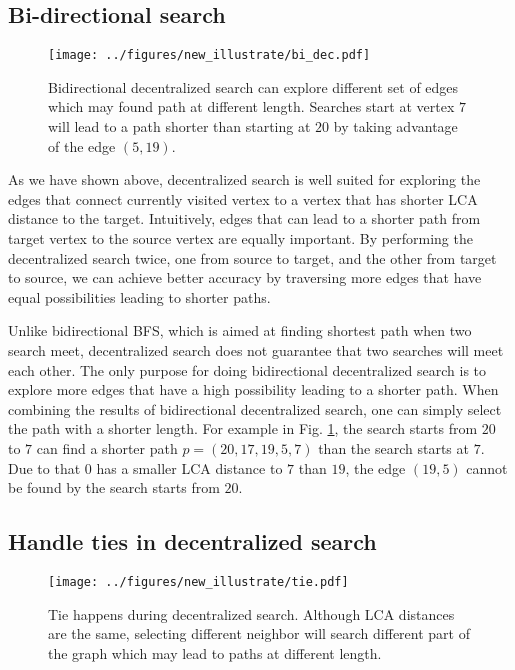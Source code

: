 \subsection{Bi-directional search}

\begin{figure}[t]
    \centering
    \texttt{[image: ../figures/new\_illustrate/bi\_dec.pdf]}
    \caption{Bidirectional decentralized search can explore different set of edges which may found path at different length. Searches start at vertex $7$ will lead to a path shorter than starting at $20$ by taking advantage of the edge $(5, 19)$.}
    \label{fig:bi_dec}
\end{figure}

As we have shown above, decentralized search is well suited for exploring the edges that connect currently visited vertex to a vertex that has shorter LCA distance to the target. Intuitively, edges that can lead to a shorter path from target vertex to the source vertex are equally important. By performing the decentralized search twice, one from source to target, and the other from target to source, we can achieve better accuracy by traversing more edges that have equal possibilities leading to shorter paths.

Unlike bidirectional BFS, which is aimed at finding shortest path when two search meet, decentralized search does not guarantee that two searches will meet each other. The only purpose for doing bidirectional decentralized search is to explore more edges that have a high possibility leading to a shorter path. When combining the results of bidirectional decentralized search, one can simply select the path with a shorter length. For example in Fig. \ref{fig:bi_dec}, the search starts from $20$ to $7$ can find a shorter path $p = (20, 17, 19, 5, 7)$ than the search starts at $7$. Due to that $0$ has a smaller LCA distance to $7$ than $19$, the edge $(19, 5)$ cannot be found by the search starts from $20$.

\subsection{Handle ties in decentralized search}

\begin{figure}[t]
    \centering
    \texttt{[image: ../figures/new\_illustrate/tie.pdf]}
    \caption{Tie happens during decentralized search. Although LCA distances are the same, selecting different neighbor will search different part of the graph which may lead to paths at different length.}
    \label{fig:tie}
\end{figure}

